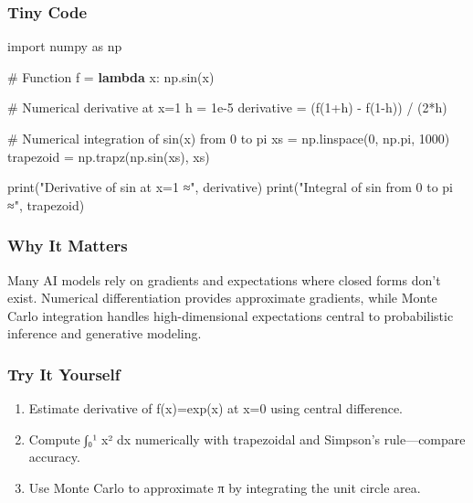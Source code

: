 \documentclass[
  letterpaper,
  DIV=11,
  numbers=noendperiod]{scrreprt}
\newenvironment{Shaded}{\begin{snugshade}}{\end{snugshade}}
\newcommand{\BuiltInTok}[1]{\textcolor[rgb]{0.00,0.23,0.31}{#1}}
\newcommand{\CommentTok}[1]{\textcolor[rgb]{0.37,0.37,0.37}{#1}}
\newcommand{\DecValTok}[1]{\textcolor[rgb]{0.68,0.00,0.00}{#1}}
\newcommand{\FloatTok}[1]{\textcolor[rgb]{0.68,0.00,0.00}{#1}}
\newcommand{\ImportTok}[1]{\textcolor[rgb]{0.00,0.46,0.62}{#1}}
\newcommand{\KeywordTok}[1]{\textcolor[rgb]{0.00,0.23,0.31}{\textbf{#1}}}
\newcommand{\NormalTok}[1]{\textcolor[rgb]{0.00,0.23,0.31}{#1}}
\newcommand{\OperatorTok}[1]{\textcolor[rgb]{0.37,0.37,0.37}{#1}}
\newcommand{\StringTok}[1]{\textcolor[rgb]{0.13,0.47,0.30}{#1}}
\providecommand{\tightlist}{%
  \setlength{\itemsep}{0pt}\setlength{\parskip}{0pt}}
\begin{document}
\subsubsection{Tiny Code}\label{tiny-code-154}

\begin{Shaded}
\begin{Highlighting}[]
\ImportTok{import}\NormalTok{ numpy }\ImportTok{as}\NormalTok{ np}

\CommentTok{\# Function}
\NormalTok{f }\OperatorTok{=} \KeywordTok{lambda}\NormalTok{ x: np.sin(x)}

\CommentTok{\# Numerical derivative at x=1}
\NormalTok{h }\OperatorTok{=} \FloatTok{1e{-}5}
\NormalTok{derivative }\OperatorTok{=}\NormalTok{ (f(}\DecValTok{1}\OperatorTok{+}\NormalTok{h) }\OperatorTok{{-}}\NormalTok{ f(}\DecValTok{1}\OperatorTok{{-}}\NormalTok{h)) }\OperatorTok{/}\NormalTok{ (}\DecValTok{2}\OperatorTok{*}\NormalTok{h)}

\CommentTok{\# Numerical integration of sin(x) from 0 to pi}
\NormalTok{xs }\OperatorTok{=}\NormalTok{ np.linspace(}\DecValTok{0}\NormalTok{, np.pi, }\DecValTok{1000}\NormalTok{)}
\NormalTok{trapezoid }\OperatorTok{=}\NormalTok{ np.trapz(np.sin(xs), xs)}

\BuiltInTok{print}\NormalTok{(}\StringTok{"Derivative of sin at x=1 ≈"}\NormalTok{, derivative)}
\BuiltInTok{print}\NormalTok{(}\StringTok{"Integral of sin from 0 to pi ≈"}\NormalTok{, trapezoid)}
\end{Highlighting}
\end{Shaded}

\subsubsection{Why It Matters}\label{why-it-matters-52}

Many AI models rely on gradients and expectations where closed forms
don't exist. Numerical differentiation provides approximate gradients,
while Monte Carlo integration handles high-dimensional expectations
central to probabilistic inference and generative modeling.

\subsubsection{Try It Yourself}\label{try-it-yourself-154}

\begin{enumerate}
\def\labelenumi{\arabic{enumi}.}
\tightlist
\item
  Estimate derivative of f(x)=exp(x) at x=0 using central difference.
\item
  Compute ∫₀¹ x² dx numerically with trapezoidal and Simpson's
  rule---compare accuracy.
\item
  Use Monte Carlo to approximate π by integrating the unit circle area.
\end{enumerate}
\end{document}
